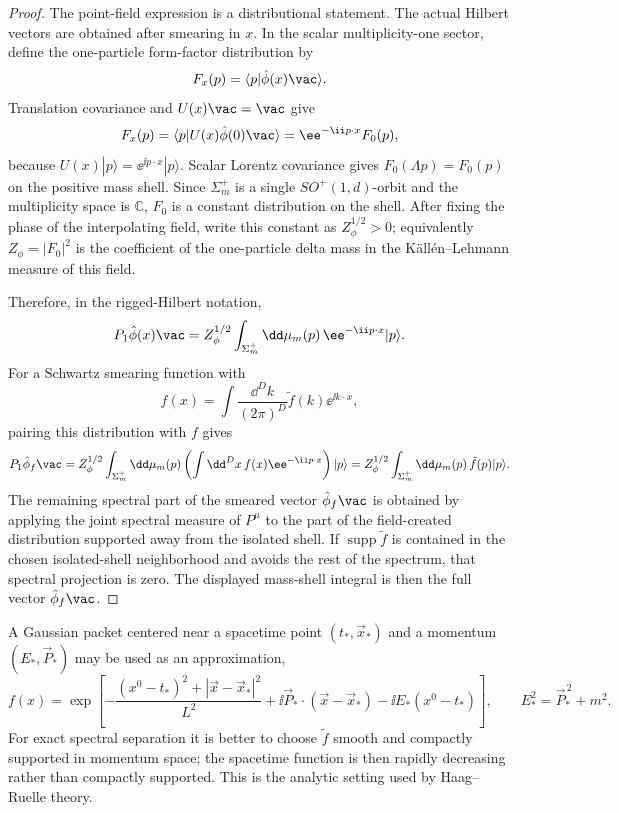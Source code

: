 \begin{proof}
The point-field expression is a distributional statement.  The actual Hilbert
vectors are obtained after smearing in \(x\).  In the scalar multiplicity-one
sector, define the one-particle form-factor distribution by
\[
  F_x(p)=\langle p|\hat\phi(x)\vac\rangle .
\]
Translation covariance and \(U(x)\vac=\vac\) give
\[
  F_x(p)
  =
  \langle p|U(x)\hat\phi(0)\vac\rangle
  =
  \ee^{-\ii p\cdot x}F_0(p),
\]
because \(U(x)|p\rangle=\ee^{\ii p\cdot x}|p\rangle\).  Scalar Lorentz
covariance gives \(F_0(\Lambda p)=F_0(p)\) on the positive mass shell.  Since
\(\Sigma_m^+\) is a single \(SO^+(1,d)\)-orbit and the multiplicity space is
\(\mathbb C\), \(F_0\) is a constant distribution on the shell.  After fixing
the phase of the interpolating field, write this constant as
\(Z_\phi^{1/2}>0\); equivalently \(Z_\phi=|F_0|^2\) is the coefficient of the
one-particle delta mass in the K\"all\'en--Lehmann measure of this field.

Therefore, in the rigged-Hilbert notation,
\[
  P_1\hat\phi(x)\vac
  =
  Z_\phi^{1/2}
  \int_{\Sigma_m^+}\dd\mu_m(p)\,\ee^{-\ii p\cdot x}|p\rangle .
\]
For a Schwartz smearing function with
\[
  f(x)=\int\frac{\dd^D k}{(2\pi)^D}\tilde f(k)\ee^{\ii k\cdot x},
\]
pairing this distribution with \(f\) gives
\[
  P_1\hat\phi_f\vac
  =
  Z_\phi^{1/2}
  \int_{\Sigma_m^+}\dd\mu_m(p)
  \left(\int\dd^Dx\,f(x)\ee^{-\ii p\cdot x}\right)|p\rangle
  =
  Z_\phi^{1/2}
  \int_{\Sigma_m^+}\dd\mu_m(p)\,\tilde f(p)|p\rangle .
\]
The remaining spectral part of the smeared vector \(\hat\phi_f\vac\) is
obtained by applying the joint spectral measure of \(P^\mu\) to the part of
the field-created distribution supported away from the isolated shell.  If
\(\operatorname{supp}\tilde f\) is contained in the chosen isolated-shell
neighborhood and avoids the rest of the spectrum, that spectral projection is
zero.  The displayed mass-shell integral is then the full vector
\(\hat\phi_f\vac\).
\end{proof}

A Gaussian packet centered near a spacetime point \((t_*,\vec x_*)\) and a
momentum \((E_*,\vec P_*)\) may be used as an approximation,
\[
  f(x)
  =
  \exp\left[
    -\frac{(x^0-t_*)^2+|\vec x-\vec x_*|^2}{L^2}
    +\ii\vec P_*\cdot(\vec x-\vec x_*)
    -\ii E_*(x^0-t_*)
  \right],
  \qquad E_*^2=\vec P_*^{\,2}+m^2 .
\]
For exact spectral separation it is better to choose \(\tilde f\) smooth and
compactly supported in momentum space; the spacetime function is then rapidly
decreasing rather than compactly supported.  This is the analytic setting used
by Haag--Ruelle theory.

